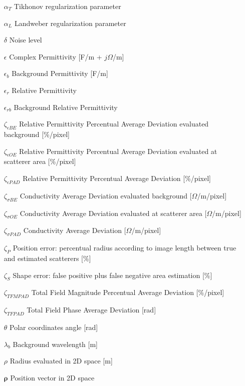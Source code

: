 		\thispagestyle{empty}
	
		\begin{itemize}[labelwidth=4em,leftmargin=\dimexpr{}+\relax,align=left]
			\item[$\alpha_{T}$] Tikhonov regularization parameter
			\item[$\alpha_{L}$] Landweber regularization parameter
			\item[$\delta$] Noise level
			\item[$\epsilon$] Complex Permittivity [F/m + $j\Omega$/m]
			\item[$\epsilon_b$] Background Permittivity [F/m]
			\item[$\epsilon_r$] Relative Permittivity
			\item[$\epsilon_{rb}$] Background Relative Permittivity
			\item[$\zeta_{\epsilon BE}$] Relative Permittivity Percentual Average Deviation evaluated background [\%/pixel]
			\item[$\zeta_{\epsilon OE}$] Relative Permittivity Percentual Average Deviation evaluated at scatterer area [\%/pixel]
			\item[$\zeta_{\epsilon PAD}$] Relative Permittivity Percentual Average Deviation [\%/pixel]
			\item[$\zeta_{\sigma BE}$] Conductivity Average Deviation evaluated background [$\Omega$/m/pixel]
			\item[$\zeta_{\sigma OE}$] Conductivity  Average Deviation evaluated at scatterer area [$\Omega$/m/pixel]
			\item[$\zeta_{\sigma PAD}$] Conductivity Average Deviation [$\Omega$/m/pixel]
			\item[$\zeta_P$] Position error: percentual radius according to image length between true and estimated scatterers [\%]
			\item[$\zeta_{S}$] Shape error: false positive plus false negative area estimation [\%]
			\item[$\zeta_{TFMPAD}$] Total Field Magnitude Percentual Average Deviation [\%/pixel]
			\item[$\zeta_{TFPAD}$] Total Field Phase Average Deviation [rad]
			\item[$\theta$] Polar coordinates angle [rad]
			\item[$ \lambda_b $] Background wavelength [m]
			\item[$\rho$] Radius evaluated in 2D space [m]
			\item[$\boldsymbol{\rho}$] Position vector in 2D space

\end{itemize}
